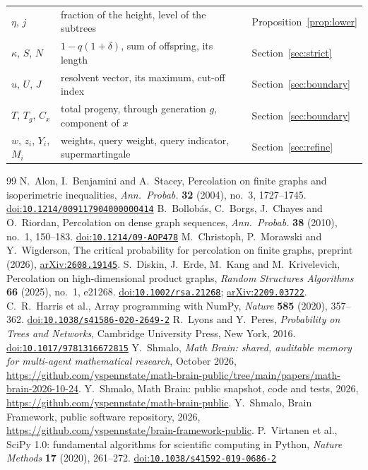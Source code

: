 \documentclass[11pt]{amsart}
\theoremstyle{remark}
\newcommand{\doi}[1]{\href{https://doi.org/#1}{doi:\nolinkurl{#1}}}
\newcommand{\arxiv}[1]{\href{https://arxiv.org/abs/#1}{arXiv:\nolinkurl{#1}}}
\begin{document}
\begin{center}
\begin{tabular}{p{3.0cm}p{8.0cm}p{3.1cm}}
$\eta$, $j$ & fraction of the height, level of the subtrees & Proposition~\ref{prop:lower}\\
$\kappa$, $S$, $N$ & $1-q(1+\delta)$, sum of offspring, its length & Section~\ref{sec:strict}\\
$u$, $U$, $J$ & resolvent vector, its maximum, cut-off index & Section~\ref{sec:boundary}\\
$T$, $T_g$, $C_x$ & total progeny, through generation $g$, component of $x$ & Section~\ref{sec:boundary}\\
$w$, $z_i$, $Y_i$, $M_i$ & weights, query weight, query indicator, supermartingale & Section~\ref{sec:refine}\\
\bottomrule
\end{tabular}
\end{center}

\begin{thebibliography}{99}
 N.~Alon, I.~Benjamini and A.~Stacey, Percolation on finite graphs and isoperimetric inequalities,
\emph{Ann.\ Probab.} \textbf{32} (2004), no.~3, 1727--1745. \doi{10.1214/009117904000000414}
 B.~Bollobás, C.~Borgs, J.~Chayes and O.~Riordan, Percolation on dense graph sequences, \emph{Ann.\
Probab.} \textbf{38} (2010), no.~1, 150--183. \doi{10.1214/09-AOP478}
\bibitem{CMW26} M.~Christoph, P.~Morawski and Y.~Wigderson, The critical probability for percolation on finite graphs,
preprint (2026), \arxiv{2608.19145}.
 S.~Diskin, J.~Erde, M.~Kang and M.~Krivelevich, Percolation on high-dimensional product graphs,
\emph{Random Structures Algorithms} \textbf{66} (2025), no.~1, e21268. \doi{10.1002/rsa.21268}; \arxiv{2209.03722}.
\bibitem{NumPy} C.~R.~Harris et al., Array programming with NumPy, \emph{Nature} \textbf{585} (2020), 357--362.
\doi{10.1038/s41586-020-2649-2}
 R.~Lyons and Y.~Peres, \emph{Probability on Trees and Networks}, Cambridge University Press, New York,
2016. \doi{10.1017/9781316672815}
 Y.~Shmalo, \emph{Math Brain: shared, auditable memory for multi-agent mathematical research},
October 2026, \url{https://github.com/yspennstate/math-brain-public/tree/main/papers/math-brain-2026-10-24}.
\bibitem{MathBrainRepo} Y.~Shmalo, Math Brain: public snapshot, code and tests, 2026,
\url{https://github.com/yspennstate/math-brain-public}.
 Y.~Shmalo, Brain Framework, public software repository, 2026,
\url{https://github.com/yspennstate/brain-framework-public}.
 P.~Virtanen et al., SciPy 1.0: fundamental algorithms for scientific computing in Python, \emph{Nature
Methods} \textbf{17} (2020), 261--272. \doi{10.1038/s41592-019-0686-2}
\end{thebibliography}
\end{document}

